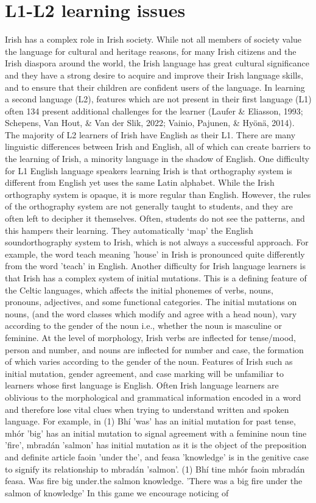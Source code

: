 \documentclass[10pt,twoside,english,a4paper]{article}
\begin{document}
\section{L1-L2 learning issues}
 Irish has a complex role in Irish society. While not all members of society value the language for cultural and heritage reasons, for many Irish citizens and the Irish diaspora around the world, the Irish language has great cultural significance and they have a strong desire to acquire and improve their Irish language skills, and to ensure that their children are confident users of the language. In learning a second language (L2), features which are not present in their first language (L1) often 134  present additional challenges for the learner (Laufer \& Eliasson, 1993; Schepens, Van Hout, \& Van der Slik, 2022; Vainio, Pajunen, \& Hyönä, 2014). The majority of L2 learners of Irish have English as their L1. There are many linguistic differences between Irish and English, all of which can create barriers to the learning of Irish, a minority language in the shadow of English. One difficulty for L1 English language speakers learning Irish is that orthography system is different from English yet uses the same Latin alphabet. While the Irish orthography system is opaque, it is more regular than English. However, the rules of the orthography system are not generally taught to students, and they are often left to decipher it themselves. Often, students do not see the patterns, and this hampers their learning. They automatically ‘map’ the English soundorthography system to Irish, which is not always a successful approach. For example, the word teach meaning 'house' in Irish is pronounced quite differently from the word 'teach' in English. Another difficulty for Irish language learners is that Irish has a complex system of initial mutations. This is a defining feature of the Celtic languages, which affects the initial phonemes of verbs, nouns, pronouns, adjectives, and some functional categories. The initial mutations on nouns, (and the word classes which modify and agree with a head noun), vary according to the gender of the noun i.e., whether the noun is masculine or feminine. At the level of morphology, Irish verbs are inflected for tense/mood, person and number, and nouns are inflected for number and case, the formation of which varies according to the gender of the noun. Features of Irish such as initial mutation, gender agreement, and case marking will be unfamiliar to learners whose first language is English. Often Irish language learners are oblivious to the morphological and grammatical information encoded in a word and therefore lose vital clues when trying to understand written and spoken language. For example, in (1) Bhí 'was' has an initial mutation for past tense, mhór 'big' has an initial mutation to signal agreement with a feminine noun tine 'fire', mbradán 'salmon' has initial mutation as it is the object of the preposition and definite article faoin 'under the', and feasa 'knowledge' is in the genitive case to signify its relationship to mbradán 'salmon'. (1) Bhí tine mhór faoin mbradán feasa. Was fire big under.the salmon knowledge. 'There was a big fire under the salmon of knowledge' In this game we encourage noticing of 
\end{document}

